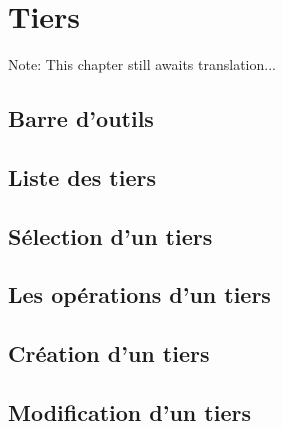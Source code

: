 
\chapter{Tiers\label{thirdparties}}

Note: This chapter still awaits translation...


\section{Barre d'outils\label{thirdparties-functions}}


\section{Liste des tiers\label{thirdparties-list}}


\section{Sélection d'un tiers\label{thirdparties-selection}}


\section{Les opérations d'un tiers\label{thirdparties-transactions}}


\section{Création d'un tiers\label{thirdparties-new}}


\section{Modification d'un tiers\label{thirdparties-modify}}


